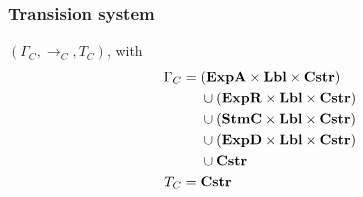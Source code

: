 \subsubsection{Transision system}
$(\Gamma_{C}, \rightarrow_{C}, T_{C})$, with
\begin{align*}
  \Gamma_{C} =  & \;  (\mathbf{ExpA} \times \mathbf{Lbl} \times \mathbf{Cstr}) \\
                & \;  \cup (\mathbf{ExpR} \times \mathbf{Lbl} \times \mathbf{Cstr}) \\
                & \;  \cup (\mathbf{StmC} \times \mathbf{Lbl} \times \mathbf{Cstr}) \\
                & \;  \cup (\mathbf{ExpD} \times \mathbf{Lbl} \times \mathbf{Cstr}) \\
                & \;  \cup \mathbf{Cstr} \\
  T_{C} =       & \;  \mathbf{Cstr}
\end{align*}


